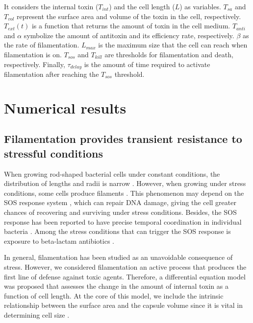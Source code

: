 \documentclass[
  12pt,
  a4paper,
  oneside]{krantz}
\begin{document}
It considers the internal toxin (\(T_{int}\)) and the cell length (\(L\)) as
variables. \(T_{sa}\) and \(T_{vol}\) represent the surface area and volume
of the toxin in the cell, respectively. \(T_{ext}(t)\) is a function that
returns the amount of toxin in the cell medium. \(T_{anti}\) and \(\alpha\)
symbolize the amount of antitoxin and its efficiency rate, respectively.
\(\beta\) as the rate of filamentation. \(L_{max}\) is the maximum size that
the cell can reach when filamentation is on. \(T_{sos}\) and \(T_{kill}\)
are thresholds for filamentation and death, respectively. Finally,
\(\tau_{delay}\) is the amount of time required to activate filamentation
after reaching the \(T_{sos}\) threshold.

\hypertarget{numerical-results}{%
\section{Numerical results}\label{numerical-results}}

\hypertarget{filamentation-provides-transient-resistance-to-stressful-conditions}{%
\subsection{Filamentation provides transient resistance to stressful conditions}\label{filamentation-provides-transient-resistance-to-stressful-conditions}}

When growing rod-shaped bacterial cells under constant conditions, the
distribution of lengths and radii is narrow
\citep{schaechterGrowthCellNuclear1962}. However, when growing under stress
conditions, some cells produce filaments
\citep{schaechterDependencyMediumTemperature1958}. This phenomenon may depend
on the SOS response system \citep{bosEmergenceAntibioticResistance2015},
which can repair DNA damage, giving the cell greater chances of
recovering and surviving under stress conditions. Besides, the SOS
response has been reported to have precise temporal coordination in
individual bacteria \citep{friedmanPreciseTemporalModulation2005}. Among the
stress conditions that can trigger the SOS response is exposure to
beta-lactam antibiotics \citep{millerSOSResponseInduction2004}.

In general, filamentation has been studied as an unavoidable consequence
of stress. However, we considered filamentation an active process that
produces the first line of defense against toxic agents. Therefore, a
differential equation model was proposed that assesses the change in the
amount of internal toxin as a function of cell length. At the core of
this model, we include the intrinsic relationship between the surface
area and the capsule volume since it is vital in determining cell size
\citep{harrisRelativeRatesSurface2016}.
\end{document}
